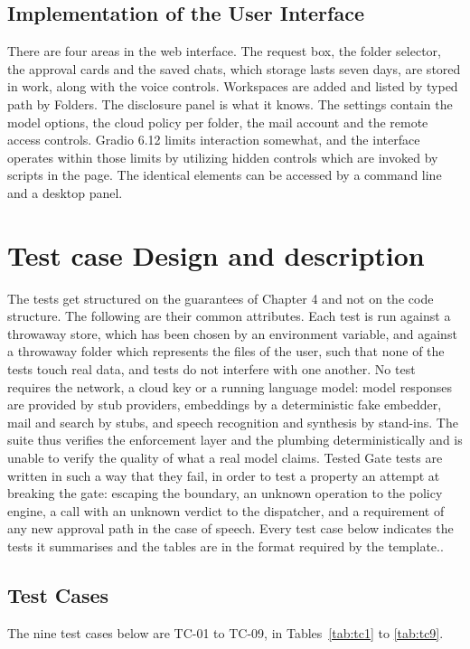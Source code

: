 \documentclass{FastFyp}
\begin{document}
\subsection{Implementation of the User Interface}
There are four areas in the web interface. The request box, the folder selector, the approval cards and the saved chats, which storage lasts seven days, are stored in work, along with the voice controls. Workspaces are added and listed by typed path by Folders. The disclosure panel is what it knows. The settings contain the model options, the cloud policy per folder, the mail account and the remote access controls. Gradio 6.12 limits interaction somewhat, and the interface operates within those limits by utilizing hidden controls which are invoked by scripts in the page. The identical elements can be accessed by a command line and a desktop panel.

\section{Test case Design and description}
The tests get structured on the guarantees of Chapter 4 and not on the code structure. The following are their common attributes. Each test is run against a throwaway store, which has been chosen by an environment variable, and against a throwaway folder which represents the files of the user, such that none of the tests touch real data, and tests do not interfere with one another. No test requires the network, a cloud key or a running language model: model responses are provided by stub providers, embeddings by a deterministic fake embedder, mail and search by stubs, and speech recognition and synthesis by stand-ins. The suite thus verifies the enforcement layer and the plumbing deterministically and is unable to verify the quality of what a real model claims. Tested Gate tests are written in such a way that they fail, in order to test a property an attempt at breaking the gate: escaping the boundary, an unknown operation to the policy engine, a call with an unknown verdict to the dispatcher, and a requirement of any new approval path in the case of speech. Every test case below indicates the tests it summarises and the tables are in the format required by the template..

\subsection{Test Cases}
The nine test cases below are TC-01 to TC-09, in Tables~\ref{tab:tc1} to \ref{tab:tc9}.
\end{document}
